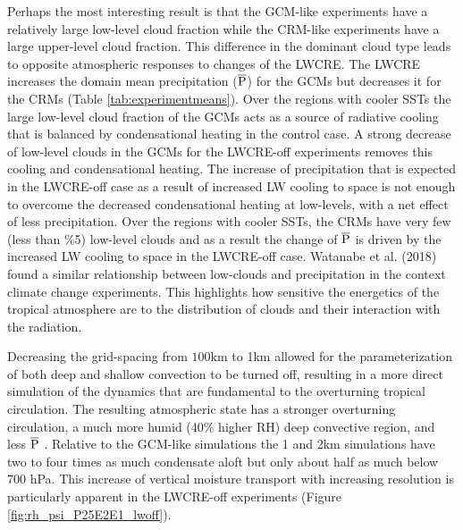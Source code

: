 \documentclass[draft]{agujournal2019}
\begin{document}
{Perhaps the most interesting result is that the GCM-like experiments have a relatively large low-level 
cloud fraction while the CRM-like experiments have a large upper-level cloud fraction.  
This difference in the dominant cloud type leads to opposite atmospheric responses to changes of the LWCRE.  
The LWCRE increases the domain mean precipitation ($\overline{\rm{P}}$) for the GCMs but 
decreases it for the CRMs (Table \ref{tab:experimentmeans}).  
Over the regions with cooler SSTs the large low-level cloud fraction of the GCMs 
acts as a source of radiative cooling that is balanced by condensational heating in the control case.  
A strong decrease of low-level clouds in the GCMs
for the LWCRE-off experiments removes this cooling and condensational heating.  The increase 
of precipitation that is expected in the LWCRE-off case as a result of increased LW cooling to space is not enough
to overcome the decreased condensational heating at low-levels, with a net effect of less precipitation.  
Over the regions with cooler SSTs, the CRMs have very few (less than \%5) low-level clouds and as a result the 
change of $\overline{\rm{P}}$ is driven by the increased LW cooling to space in the LWCRE-off case.
Watanabe et al. (2018) found a similar relationship between low-clouds and precipitation in the context climate 
change experiments.
This highlights how sensitive the energetics of the tropical atmosphere are to the distribution of clouds and 
their interaction with the radiation.      

Decreasing the grid-spacing from $100 \textrm{km}$ to 1km allowed for the parameterization of both deep and shallow 
convection to be turned off, resulting in a more direct simulation of the dynamics that are
fundamental to the overturning tropical circulation.  The resulting atmospheric state has a stronger overturning 
circulation, a much more humid (40\% higher RH) deep convective region, and less $\overline{\rm{P}}$ .  
Relative to the GCM-like simulations the 1 and 2km simulations have two to four times as much condensate
aloft but only about half as much below 700 hPa.  This increase of vertical moisture transport with increasing 
resolution is particularly apparent in the LWCRE-off experiments (Figure \ref{fig:rh_psi_P25E2E1_lwoff}).   

}
\end{document}
